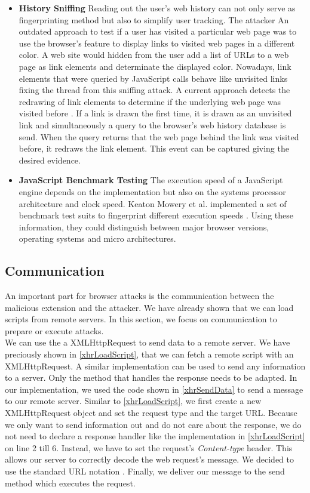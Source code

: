 \begin{itemize}
				\item \textbf{History Sniffing} Reading out the user's web history can not only serve as fingerprinting method but also to simplify user tracking. The attacker  An outdated approach to test if a user has visited a particular web page was to use the browser's feature to display links to visited web pages in a different color. A web site would hidden from the user add a list of URLs to a web page as link elements and determinate the displayed color. Nowadays, link elements that were queried by JavaScript calls behave like unvisited links fixing the thread from this sniffing attack. A current approach detects the redrawing of link elements to determine if the underlying web page was visited before \cite{paulstone_historysniffing}. If a link is drawn the first time, it is drawn as an unvisited link and simultaneously a query to the browser's web history database is send. When the query returns that the web page behind the link was visited before, it redraws the link element. This event can be captured giving the desired evidence.
				
				\item \textbf{JavaScript Benchmark Testing} The execution speed of a JavaScript engine depends on the implementation but also on the systems processor architecture and clock speed. Keaton Mowery et al. implemented a set of benchmark test suits to fingerprint different execution speeds \cite{MBYS11}. Using these information, they could distinguish between major browser versions, operating systems and micro architectures. 
			\end{itemize}
	
	\subsection{Communication}
	
		An important part for browser attacks is the communication between the malicious extension and the attacker. We have already shown that we can load scripts from remote servers. In this section, we focus on communication to prepare or execute attacks. \\ %
		
		We can use the a XMLHttpRequest to send data to a remote server. We have preciously shown in \autoref{xhrLoadScript}, that we can fetch a remote script with an XMLHttpRequest. A similar implementation can be used to send any information to a server. Only the method that handles the response needs to be adapted. In our implementation, we used the code shown in \autoref{xhrSendData} to send a message to our remote server. Similar to \autoref{xhrLoadScript}, we first create a new XMLHttpRequest object and set the request type and the target URL. Because we only want to send information out and do not care about the response, we do not need to declare a response handler like the implementation in \autoref{xhrLoadScript} on line 2 till 6. Instead, we have to set the request's \textit{Content-type} header. This allows our server to correctly decode the web request's message. We decided to use the standard URL notation \cite{w3cUrlSpecifications}. Finally, we deliver our message to the send method which executes the request. 
		
